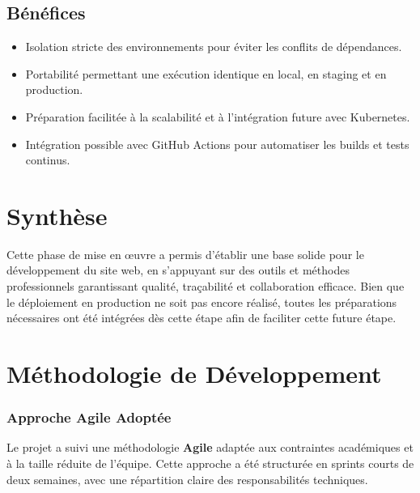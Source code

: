 \documentclass{rapportPfe}
\begin{document}
\subsection{Bénéfices}

\begin{itemize}
    \item Isolation stricte des environnements pour éviter les conflits de dépendances.
    \item Portabilité permettant une exécution identique en local, en staging et en production.
    \item Préparation facilitée à la scalabilité et à l’intégration future avec Kubernetes.
    \item Intégration possible avec GitHub Actions pour automatiser les builds et tests continus.
\end{itemize}

\section{Synthèse}

Cette phase de mise en œuvre a permis d'établir une base solide pour le développement du site web, en s'appuyant sur des outils et méthodes professionnels garantissant qualité, traçabilité et collaboration efficace. Bien que le déploiement en production ne soit pas encore réalisé, toutes les préparations nécessaires ont été intégrées dès cette étape afin de faciliter cette future étape.

\section{Méthodologie de Développement}
\subsubsection{Approche Agile Adoptée}
Le projet a suivi une méthodologie \textbf{Agile} adaptée aux contraintes académiques et à la taille réduite de l'équipe. Cette approche a été structurée en sprints courts de deux semaines, avec une répartition claire des responsabilités techniques.
\end{document}
